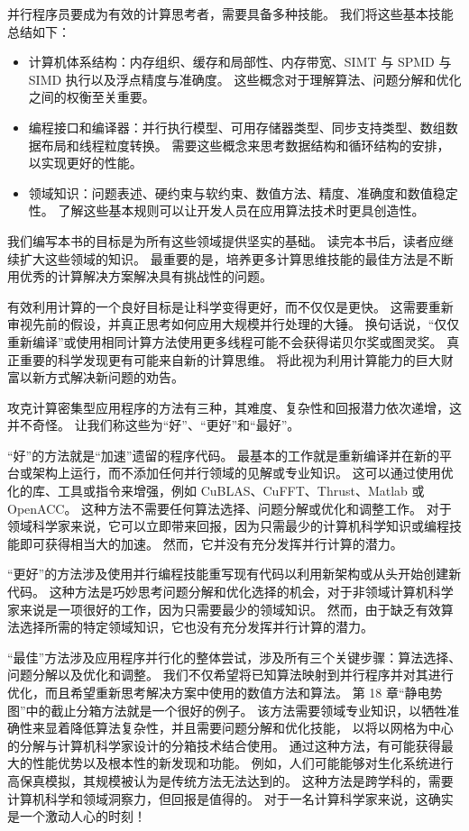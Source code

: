 并行程序员要成为有效的计算思考者，需要具备多种技能。 我们将这些基本技能总结如下：
\begin{itemize}
	\item 计算机体系结构：内存组织、缓存和局部性、内存带宽、SIMT 与 SPMD 与 SIMD 执行以及浮点精度与准确度。 
		这些概念对于理解算法、问题分解和优化之间的权衡至关重要。

	\item 编程接口和编译器：并行执行模型、可用存储器类型、同步支持类型、数组数据布局和线程粒度转换。 
		需要这些概念来思考数据结构和循环结构的安排，以实现更好的性能。

	\item 领域知识：问题表述、硬约束与软约束、数值方法、精度、准确度和数值稳定性。 
		了解这些基本规则可以让开发人员在应用算法技术时更具创造性。
\end{itemize}

我们编写本书的目标是为所有这些领域提供坚实的基础。 读完本书后，读者应继续扩大这些领域的知识。 
最重要的是，培养更多计算思维技能的最佳方法是不断用优秀的计算解决方案解决具有挑战性的问题。

有效利用计算的一个良好目标是让科学变得更好，而不仅仅是更快。 
这需要重新审视先前的假设，并真正思考如何应用大规模并行处理的大锤。 
换句话说，“仅仅重新编译”或使用相同计算方法使用更多线程可能不会获得诺贝尔奖或图灵奖。
 真正重要的科学发现更有可能来自新的计算思维。 将此视为利用计算能力的巨大财富以新方式解决新问题的劝告。

攻克计算密集型应用程序的方法有三种，其难度、复杂性和回报潜力依次递增，这并不奇怪。 
让我们称这些为“好”、“更好”和“最好”。

“好”的方法就是“加速”遗留的程序代码。 
最基本的工作就是重新编译并在新的平台或架构上运行，而不添加任何并行领域的见解或专业知识。 
这可以通过使用优化的库、工具或指令来增强，例如 CuBLAS、CuFFT、Thrust、Matlab 或 OpenACC。 
这种方法不需要任何算法选择、问题分解或优化和调整工作。 
对于领域科学家来说，它可以立即带来回报，因为只需最少的计算机科学知识或编程技能即可获得相当大的加速。 
然而，它并没有充分发挥并行计算的潜力。

“更好”的方法涉及使用并行编程技能重写现有代码以利用新架构或从头开始创建新代码。 
这种方法是巧妙思考问题分解和优化选择的机会，对于非领域计算机科学家来说是一项很好的工作，因为只需要最少的领域知识。 
然而，由于缺乏有效算法选择所需的特定领域知识，它也没有充分发挥并行计算的潜力。

“最佳”方法涉及应用程序并行化的整体尝试，涉及所有三个关键步骤：算法选择、问题分解以及优化和调整。 
我们不仅希望将已知算法映射到并行程序并对其进行优化，而且希望重新思考解决方案中使用的数值方法和算法。 
第 18 章“静电势图”中的截止分箱方法就是一个很好的例子。 
该方法需要领域专业知识，以牺牲准确性来显着降低算法复杂性，并且需要问题分解和优化技能，
以将以网格为中心的分解与计算机科学家设计的分箱技术结合使用。 
通过这种方法，有可能获得最大的性能优势以及根本性的新发现和功能。 
例如，人们可能能够对生化系统进行高保真模拟，其规模被认为是传统方法无法达到的。 
这种方法是跨学科的，需要计算机科学和领域洞察力，但回报是值得的。 对于一名计算科学家来说，这确实是一个激动人心的时刻！


